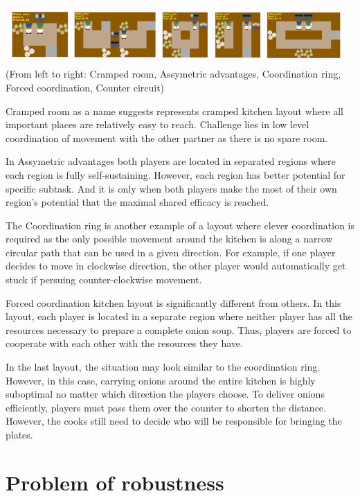 \includegraphics*[width=13cm]{layouts.png}
\break
(From left to right: Cramped room, Assymetric advantages, Coordination ring, Forced coordination, Counter circuit)
\par 
Cramped room as a name suggests represents cramped kitchen layout where all important places are relatively easy to reach. Challenge lies in low level coordination of movement with the other partner as there is no spare room.
\par
In Assymetric advantages both players are located in separated regions where each region is fully self-sustaining. However, each region has better potential for specific subtask. 
And it is only when both players make the most of their own region's potential that the maximal shared efficacy is reached.

\par
The Coordination ring is another example of a layout where clever coordination is required as the only possible movement around the kitchen is along a narrow circular path that can be used in a given direction.
For example, if one player decides to move in clockwise direction, the other player would automatically get stuck if persuing counter-clockwise movement.

\par
Forced coordination kitchen layout is significantly different from others. 
In this layout, each player is located in a separate region where neither player has all the resources necessary to prepare a complete onion soup. 
Thus, players are forced to cooperate with each other with the resources they have.

\par
In the last layout, the situation may look similar to the coordination ring. However, in this case, carrying onions around the entire kitchen is highly suboptimal no matter which direction the players choose. 
To deliver onions efficiently, players must pass them over the counter to shorten the distance. 
However, the cooks still need to decide who will be responsible for bringing the plates. 






\section{Problem of robustness}
